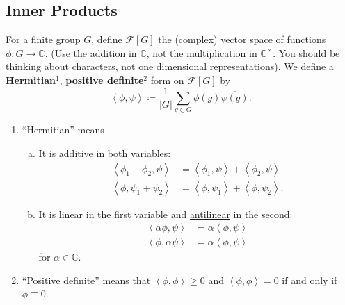 \documentclass[12pt]{article}
\newcommand{\cx}{\mathbb{C}}
\newcommand{\vbrack}[1]{\left \langle #1 \right \rangle}
\theoremstyle{definition}
\begin{document}
\subsection{Inner Products}
For a finite group $G$, define $\mathcal{F}[G]$ the (complex) vector space of functions $\phi : G \to \cx$. (Use the addition in $\cx$, not the multiplication in $\cx^{\times}$. You should be thinking about characters, not one dimensional representations). We define a \textbf{Hermitian}$^1$, \textbf{positive definite}$^2$ form on $\mathcal{F}[G]$ by 
\begin{equation}
    \vbrack{\phi , \psi} \coloneqq  \frac{1}{|G|} \sum\limits_{g \in G} \phi(g) \overline{\psi(g)}.
\end{equation}
\begin{enumerate}
    \item ``Hermitian'' means
    \begin{enumerate}[a)]
        \item It is additive in both variables: 
        \begin{equation}
            \begin{split}
                \vbrack{\phi_1 + \phi_2 , \psi} & = \vbrack{\phi_1 , \psi} + \vbrack{\phi_2 , \psi} \\
                \vbrack{\phi , \psi_1 + \psi_2} & = \vbrack{\phi , \psi_1} + \vbrack{\phi , \psi_2}.
            \end{split}
        \end{equation}
        \item It is linear in the first variable and \underline{antilinear} in the second: \begin{equation}
            \begin{split}
                \vbrack{\alpha \phi , \psi} & = \alpha \vbrack{\phi , \psi} \\
                \vbrack{\phi , \alpha \psi} & = \overline{\alpha} \vbrack{\phi , \psi}
            \end{split}
        \end{equation}
        for $\alpha \in \cx$.
    \end{enumerate}
    \item ``Positive definite'' means that $\vbrack{\phi , \phi} \geq 0$ and $\vbrack{\phi , \phi} = 0$ if and only if $\phi \equiv 0$.
\end{enumerate}
\end{document}
